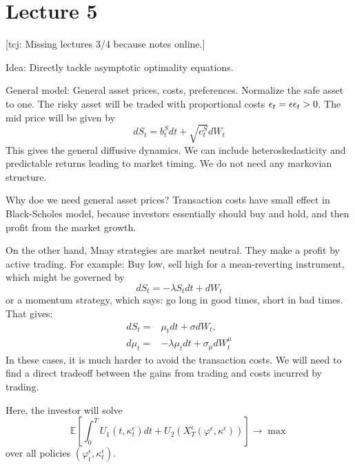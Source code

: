 \chapter{Lecture 5}
[tcj: Missing lectures 3/4 because notes online.]

Idea: Directly tackle asymptotic optimality equations.

General model: General asset prices, costs, preferences. Normalize the safe asset to one. The risky asset will be traded with proportional costs $\epsilon_t=\epsilon {\bf\epsilon}_t>0$. The mid price will be given by
\begin{equation}
	dS_t = b_t^S dt + \sqrt{c_t^S} dW_t
\end{equation}
This gives the general diffusive dynamics. We can include heteroskedasticity and predictable returns leading to market timing. We do not need any markovian structure.

Why doe we need general asset prices? Transaction costs have small effect in Black-Scholes model, because investors essentially should buy and hold, and then profit from the market growth.

On the other hand, Mnay strategies are market neutral. They make a profit by active trading. For example: Buy low, sell high for a mean-reverting instrument, which might be governed by
\begin{equation}
	dS_t = -\lambda S_t dt + dW_t
\end{equation}
or a momentum strategy, which says: go long in good times, short in bad times. That gives:
\begin{align}
	dS_t =& \mu_t dt + \sigma dW_t,\\
	d\mu_t =& -\lambda \mu_t dt + \sigma_\mu dW_t^\mu
\end{align}
In these cases, it is much harder to avoid the transaction costs. We will need to find a direct tradeoff between the gains from trading and costs incurred by trading.

Here, the investor will solve
\begin{equation}
	\mathbb{E} \left[ \int_0^T U_1(t,\kappa_t^{\epsilon})dt + U_2(X_T^\epsilon(\varphi^\epsilon, \kappa^\epsilon))\right] \to \max
\end{equation}
over all policies $(\varphi_t^\epsilon, \kappa^\epsilon_t)$.


